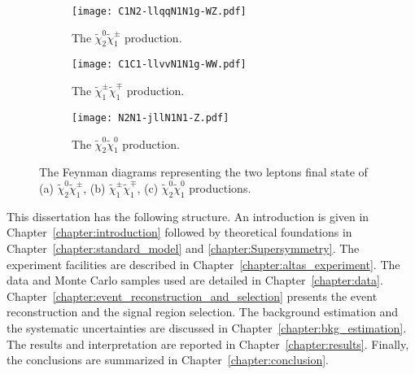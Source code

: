 \begin{figure}[htbp]
    \begin{center}
        \begin{subfigure}[b]{0.32\textwidth}
            \begin{center}
                \texttt{[image: C1N2-llqqN1N1g-WZ.pdf]}
                \caption{The $\widetilde{\chi}^{0}_{2} \widetilde{\chi}^{\pm}_{1}$ production.}
            \end{center}
        \end{subfigure}%
        \begin{subfigure}[b]{0.32\textwidth}
            \begin{center}
                \texttt{[image: C1C1-llvvN1N1g-WW.pdf]}
                \caption{The $\widetilde{\chi}^{\pm}_{1} \widetilde{\chi}^{\mp}_{1}$ production.}
            \end{center}
        \end{subfigure}
        \begin{subfigure}[b]{0.32\textwidth}
            \begin{center}
                \texttt{[image: N2N1-jllN1N1-Z.pdf]}
                \caption{The $\widetilde{\chi}^{0}_{2} \widetilde{\chi}^{0}_{1}$ production.}
            \end{center}
        \end{subfigure}
    \end{center}
    \caption{The Feynman diagrams representing the two leptons final state of (a) $\widetilde{\chi}^{0}_{2} \widetilde{\chi}^{\pm}_{1}$, (b) $\widetilde{\chi}^{\pm}_{1} \widetilde{\chi}^{\mp}_{1}$, (c) $\widetilde{\chi}^{0}_{2} \widetilde{\chi}^{0}_{1}$ productions.}
    \label{fig:intro_feynman_diagrams}
\end{figure}

This dissertation has the following structure.
An introduction is given in Chapter~\ref{chapter:introduction} followed by theoretical foundations in Chapter~\ref{chapter:standard_model} and \ref{chapter:Supersymmetry}.
The experiment facilities are described in Chapter~\ref{chapter:altas_experiment}.
The data and Monte Carlo samples used are detailed in Chapter~\ref{chapter:data}.
Chapter~\ref{chapter:event_reconstruction_and_selection} presents the event reconstruction and the signal region selection.
The background estimation and the systematic uncertainties are discussed in Chapter~\ref{chapter:bkg_estimation}.
The results and interpretation are reported in Chapter~\ref{chapter:results}.
Finally, the conclusions are summarized in Chapter~\ref{chapter:conclusion}.
